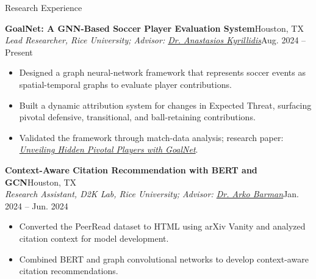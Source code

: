 \documentclass{resume}
\begin{document}
\begin{rSection}{Research Experience}
\item \textbf{GoalNet: A GNN-Based Soccer Player Evaluation System}\hfill Houston, TX\\
\textit{Lead Researcher, Rice University; Advisor: \href{https://akyrillidis.github.io/about/}{Dr. Anastasios Kyrillidis}}\hfill Aug. 2024 -- Present
\begin{itemize}[leftmargin=0.15in]
\itemsep -6pt
\item Designed a graph neural-network framework that represents soccer events as spatial-temporal graphs to evaluate player contributions.
\item Built a dynamic attribution system for changes in Expected Threat, surfacing pivotal defensive, transitional, and ball-retaining contributions.
\item Validated the framework through match-data analysis; research paper: \href{https://arxiv.org/abs/2503.09737}{\textit{Unveiling Hidden Pivotal Players with GoalNet}}.
\end{itemize}

\item \textbf{Context-Aware Citation Recommendation with BERT and GCN}\hfill Houston, TX\\
\textit{Research Assistant, D2K Lab, Rice University; Advisor: \href{https://abarman.rice.edu/}{Dr. Arko Barman}}\hfill Jan. 2024 -- Jun. 2024
\begin{itemize}[leftmargin=0.15in]
\itemsep -6pt
\item Converted the PeerRead dataset to HTML using arXiv Vanity and analyzed citation context for model development.
\item Combined BERT and graph convolutional networks to develop context-aware citation recommendations.
\end{itemize}
\end{rSection}
\end{document}
